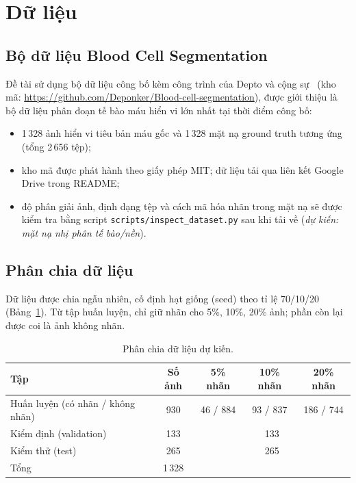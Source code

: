 \documentclass[12pt,a4paper]{article}
\begin{document}
\section{Dữ liệu}

\subsection{Bộ dữ liệu Blood Cell Segmentation}
Đề tài sử dụng bộ dữ liệu công bố kèm công trình của Depto và cộng sự~\cite{depto2021blood}
(kho mã: \url{https://github.com/Deponker/Blood-cell-segmentation}), được giới thiệu là
bộ dữ liệu phân đoạn tế bào máu hiển vi lớn nhất tại thời điểm công bố:
\begin{itemize}
  \item 1\,328 ảnh hiển vi tiêu bản máu gốc và 1\,328 mặt nạ ground truth tương ứng
        (tổng 2\,656 tệp);
  \item kho mã được phát hành theo giấy phép MIT; dữ liệu tải qua liên kết Google Drive
        trong README;
  \item độ phân giải ảnh, định dạng tệp và cách mã hóa nhãn trong mặt nạ sẽ được kiểm tra
        bằng script \texttt{scripts/inspect\_dataset.py} sau khi tải về
        (\textit{dự kiến: mặt nạ nhị phân tế bào/nền}).
\end{itemize}

\subsection{Phân chia dữ liệu}
Dữ liệu được chia ngẫu nhiên, cố định hạt giống (seed) theo tỉ lệ 70/10/20
(Bảng~\ref{tab:split}). Từ tập huấn luyện, chỉ giữ nhãn cho 5\%, 10\%, 20\% ảnh; phần
còn lại được coi là ảnh không nhãn.

\begin{table}[ht]
\centering
\caption{Phân chia dữ liệu dự kiến.}
\label{tab:split}
\begin{tabular}{lcccc}
\toprule
Tập & Số ảnh & 5\% nhãn & 10\% nhãn & 20\% nhãn \\
\midrule
Huấn luyện (có nhãn / không nhãn) & 930 & 46 / 884 & 93 / 837 & 186 / 744 \\
Kiểm định (validation)            & 133 & \multicolumn{3}{c}{133} \\
Kiểm thử (test)                   & 265 & \multicolumn{3}{c}{265} \\
\midrule
Tổng                              & 1\,328 & & & \\
\bottomrule
\end{tabular}
\end{table}
\end{document}
